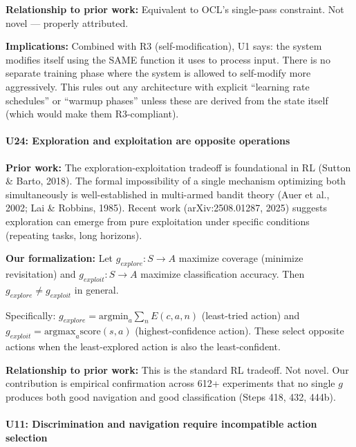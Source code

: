 \documentclass[
  11pt,
]{article}
\begin{document}
\textbf{Relationship to prior work:} Equivalent to OCL's single-pass
constraint. Not novel --- properly attributed.

\textbf{Implications:} Combined with R3 (self-modification), U1 says:
the system modifies itself using the SAME function it uses to process
input. There is no separate training phase where the system is allowed
to self-modify more aggressively. This rules out any architecture with
explicit ``learning rate schedules'' or ``warmup phases'' unless these
are derived from the state itself (which would make them R3-compliant).

\paragraph{U24: Exploration and exploitation are opposite
operations}\label{u24-exploration-and-exploitation-are-opposite-operations}

\textbf{Prior work:} The exploration-exploitation tradeoff is
foundational in RL (Sutton \& Barto, 2018). The formal impossibility of
a single mechanism optimizing both simultaneously is well-established in
multi-armed bandit theory (Auer et al., 2002; Lai \& Robbins, 1985).
Recent work (arXiv:2508.01287, 2025) suggests exploration can emerge
from pure exploitation under specific conditions (repeating tasks, long
horizons).

\textbf{Our formalization:} Let \(g_{explore}: S \to A\) maximize
coverage (minimize revisitation) and \(g_{exploit}: S \to A\) maximize
classification accuracy. Then \(g_{explore} \neq g_{exploit}\) in
general.

Specifically: \(g_{explore} = \text{argmin}_a \sum_n E(c, a, n)\)
(least-tried action) and
\(g_{exploit} = \text{argmax}_a \text{score}(s, a)\) (highest-confidence
action). These select opposite actions when the least-explored action is
also the least-confident.

\textbf{Relationship to prior work:} This is the standard RL tradeoff.
Not novel. Our contribution is empirical confirmation across 612+
experiments that no single \(g\) produces both good navigation and good
classification (Steps 418, 432, 444b).

\paragraph{U11: Discrimination and navigation require incompatible
action
selection}\label{u11-discrimination-and-navigation-require-incompatible-action-selection}
\end{document}
